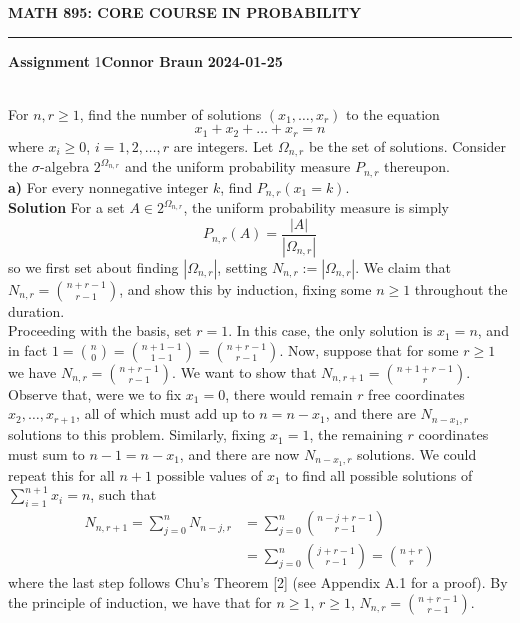 \documentclass[10pt]{article}
\newcommand{\1}[1]{\mathbbm{1}_{#1}}
\newcommand{\nck}[2]{{#1\choose#2}}
\begin{document}
    \begin{center}
        {\bf\large{MATH 895: CORE COURSE IN PROBABILITY}}
        \smallskip
        \hrule
        \smallskip
        {\bf Assignment} 1\hfill {\bf Connor Braun} \hfill {\bf 2024-01-25}
    \end{center}
    \\[5pt]
    For $n,r\geq 1$, find the number of solutions $(x_1,\dots,x_r)$ to the equation
    \[x_1+x_2+\dots +x_r=n\]
    where $x_i\geq 0$, $i=1,2,\dots, r$ are integers. Let $\Omega_{n,r}$ be the set of solutions. Consider the $\sigma$-algebra $2^{\Omega_{n,r}}$ and the uniform probability measure $P_{n,r}$ thereupon.\\[5pt]
    {\bf a)} For every nonnegative integer $k$, find $P_{n,r}(x_1=k)$.\\[5pt]
    {\bf Solution}\hspace{5pt} For a set $A\in 2^{\Omega_{n,r}}$, the uniform probability measure is simply
    \[P_{n,r}(A)=\frac{|A|}{|\Omega_{n,r}|}\]
    so we first set about finding $|\Omega_{n,r}|$, setting $N_{n,r}:=|\Omega_{n,r}|$. We claim that $N_{n,r}={n+r-1\choose r-1}$, and show this by induction, fixing some $n\geq 1$ throughout the duration.\\[5pt]
    Proceeding with the basis, set $r=1$. In this case, the only solution is $x_1=n$, and in fact $1=\nck{n}{0}=\nck{n+1-1}{1-1}=\nck{n+r-1}{r-1}$. Now, suppose that for some $r\geq 1$ we have $N_{n,r}=\nck{n+r-1}{r-1}$. We want to show that $N_{n,r+1}=\nck{n+1+r-1}{r}$.\\[5pt]
    Observe that, were we to fix $x_1=0$, there would remain $r$ free coordinates $x_2,\dots,x_{r+1}$, all of which must add up to $n=n-x_1$, and there are $N_{n-x_1,r}$ solutions to this problem. Similarly, fixing $x_1=1$, the remaining $r$ coordinates must sum to $n-1=n-x_1$, and there are now $N_{n-x_1,r}$ solutions.
    We could repeat this for all $n+1$ possible values of $x_1$ to find all possible solutions of $\sum_{i=1}^{n+1}x_i=n$, such that
    \begin{align*}
        N_{n,r+1}=\sum_{j=0}^n N_{n-j,r}&=\sum_{j=0}^n \nck{n-j+r-1}{r-1}\tag{by inductive hypothesis}\\
        &=\sum_{j=0}^n\nck{j+r-1}{r-1}=\nck{n+r}{r}\tag{9}
    \end{align*}
    where the last step follows Chu's Theorem [2] (see Appendix A.1 for a proof). By the principle of induction,
    we have that for $n\geq 1$, $r\geq 1$, $N_{n,r}=\nck{n+r-1}{r-1}$.\\[5pt]
\end{document}
